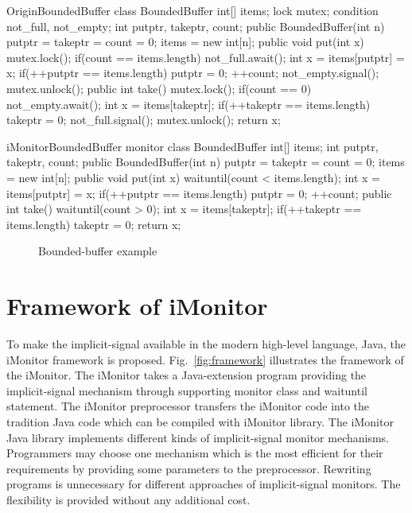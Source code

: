 \documentclass[preprint]{sigplanconf}
\begin{document}
\begin{SaveVerbatim}{OriginBoundedBuffer}
class BoundedBuffer {
  int[] items;  
  lock mutex;
  condition not_full, not_empty;
  int putptr, takeptr, count;
  public BoundedBuffer(int n) {
    putptr = takeptr = count = 0;
    items = new int[n];
  } 
  public void put(int x) {
    mutex.lock();
    if(count == items.length) {
      not_full.await();
    }
    int x = items[putptr] = x;
    if(++putptr == items.length) {
      putptr = 0;
    }
    ++count;
    not_empty.signal();
    mutex.unlock();
  }
  public int take() {
    mutex.lock();
    if(count == 0) {
      not_empty.await();
    }
    int x = items[takeptr];
    if(++takeptr == items.length) {
      takeptr = 0;
    }
    not_full.signal();
    mutex.unlock();
    return x;
  }
}
\end{SaveVerbatim}

\begin{SaveVerbatim}{iMonitorBoundedBuffer}
monitor class BoundedBuffer { 
  int[] items; 
  int putptr, takeptr, count; 
  public BoundedBuffer(int n) { 
    putptr = takeptr = count = 0; 
    items = new int[n]; 
  } 
  public void put(int x) { 
    waituntil(count < items.length); 
    int x = items[putptr] = x; 
    if(++putptr == items.length) { 
      putptr = 0; 
    } 
    ++count; 
  } 
  public int take() { 
    waituntil(count > 0); 
    int x = items[takeptr]; 
    if(++takeptr == items.length) { 
      takeptr = 0; 
    }
    return x;
  }
}
\end{SaveVerbatim}

\begin{figure}
  \centering
  \caption{Bounded-buffer example}
  \label{fig:bb_exp}
\end{figure}

\section{Framework of iMonitor} \label{sec:fw}
To make the implicit-signal available in the modern high-level language, Java, 
the iMonitor framework is proposed. Fig.~\ref{fig:framework} illustrates the 
framework of the iMonitor. The iMonitor takes a Java-extension program providing
the implicit-signal mechanism through supporting monitor class and waituntil 
statement. The iMonitor preprocessor transfers the iMonitor code into the 
tradition Java code which can be compiled with iMonitor library. The iMonitor 
Java library implements different kinds of implicit-signal monitor mechanisms. 
Programmers may choose one mechanism which is the most efficient for their 
requirements by providing some parameters to the preprocessor. Rewriting 
programs is unnecessary for different approaches of implicit-signal monitors. 
The flexibility is provided without any additional cost. 
\end{document}
